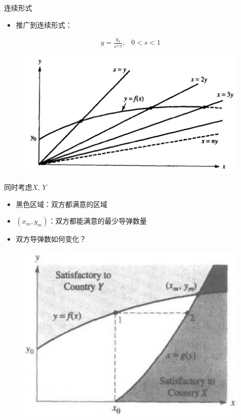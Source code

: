 \documentclass[UTF8]{ctexbeamer}
\begin{document}
\begin{frame}{连续形式}
  \begin{itemize}
  \item 推广到连续形式：
  \end{itemize}
  \[
  \begin{array}{ll}
    y = \frac{y_0}{s^{x/y}}, & 0 < s < 1
  \end{array}
  \]
  
  \begin{figure}
    \centering
    \includegraphics[width=.6\textwidth]{continue.png}
  \end{figure}
\end{frame}

\begin{frame}{同时考虑$X$, $Y$}
  \begin{itemize}
  \item 黑色区域：双方都满意的区域
  \item $(x_m, y_m)$：双方都能满意的最少导弹数量
  \item 双方导弹数如何变化？
  \end{itemize}
  
  \begin{figure}
    \centering
    \includegraphics[width=.5\textwidth]{two.png}
  \end{figure}

\end{frame}
\end{document}
